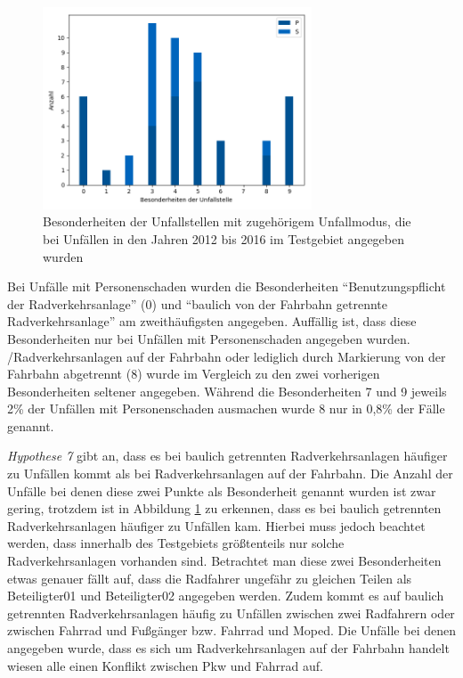 \begin{savenotes}
	\begin{figure}[H]
		\centering
		\includegraphics[width=8cm,height=6cm]{figures/BES}
		\caption[Besonderheiten der Unfallstelle mit zugehörigem Unfallmodus, die bei Unfällen in den Jahren 2012 bis 2016 im Testgebiet angegeben wurden]{Besonderheiten der Unfallstellen mit zugehörigem Unfallmodus, die bei Unfällen in den Jahren 2012 bis 2016 im Testgebiet angegeben wurden}\label{fig:BES}
	\end{figure}
\end{savenotes}

Bei Unfälle mit Personenschaden wurden die Besonderheiten \enquote{Benutzungspflicht der Radverkehrsanlage} (0) und \enquote{baulich von der Fahrbahn getrennte Radverkehrsanlage} am zweithäufigsten angegeben. Auffällig ist, dass diese Besonderheiten nur bei Unfällen mit Personenschaden angegeben wurden. /{Radverkehrsanlagen auf der Fahrbahn oder lediglich durch Markierung von der Fahrbahn abgetrennt} (8) wurde im Vergleich zu den zwei vorherigen Besonderheiten seltener angegeben. Während die Besonderheiten 7 und 9 jeweils 2\% der Unfällen mit Personenschaden ausmachen wurde 8 nur in 0,8\% der Fälle genannt.

\textit{Hypothese 7} gibt an, dass es bei baulich getrennten Radverkehrsanlagen häufiger zu Unfällen kommt als bei Radverkehrsanlagen auf der Fahrbahn. Die Anzahl der Unfälle bei denen diese zwei Punkte als Besonderheit genannt wurden ist zwar gering, trotzdem ist in Abbildung \ref{fig:BES} zu erkennen, dass es bei baulich getrennten Radverkehrsanlagen häufiger zu Unfällen  kam. Hierbei muss jedoch beachtet werden, dass innerhalb des Testgebiets größtenteils nur solche Radverkehrsanlagen vorhanden sind. Betrachtet man diese zwei Besonderheiten etwas genauer fällt auf, dass die Radfahrer ungefähr zu gleichen Teilen als Beteiligter01 und Beteiligter02 angegeben werden. Zudem kommt es auf baulich getrennten Radverkehrsanlagen häufig zu Unfällen zwischen zwei Radfahrern oder zwischen Fahrrad und Fußgänger bzw. Fahrrad und Moped. Die Unfälle bei denen angegeben wurde, dass es sich um Radverkehrsanlagen auf der Fahrbahn handelt wiesen alle einen Konflikt zwischen Pkw und Fahrrad auf.


